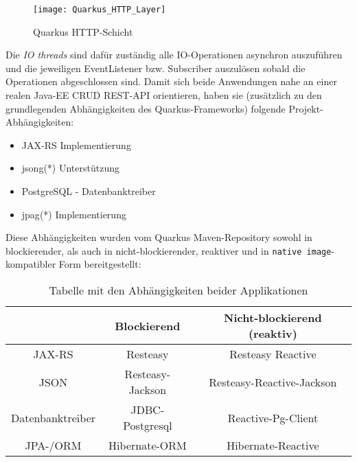 \newpage
\begin{figure}[h]
  \centering
  \texttt{[image: Quarkus\_HTTP\_Layer]}
  \caption{Quarkus HTTP-Schicht \parencite{QuarkusReactiveRoutes}}
  \label{fig:quarkus_http_schicht}
\end{figure}

Die \textit{IO threads} sind dafür zuständig alle IO-Operationen asynchron auszuführen und die jeweiligen EventListener bzw. Subscriber
auszulösen sobald die Operationen abgeschlossen sind.
Damit sich beide Anwendungen nahe an einer realen Java-EE CRUD REST-API orientieren, haben
sie (zusätzlich zu den grundlegenden Abhängigkeiten des Quarkus-Frameworks) folgende Projekt-Abhängigkeiten:
\begin{itemize}
  \item JAX-RS Implementierung
  \item \Gls{jsong}(*) Unterstützung
  \item PostgreSQL - Datenbanktreiber
  \item \Gls{jpag}(*) Implementierung
\end{itemize}

Diese Abhängigkeiten wurden vom Quarkus Maven-Repository sowohl in blockierender,
als auch in nicht-blockierender, reaktiver und in \verb|native image|-kompatibler Form bereitgestellt: \parencite{MavenQuarkusIO}
\setlength{\tabcolsep}{18pt}
\renewcommand{\arraystretch}{1.5}
\begin{table}[ht!]
  \centering
  \begin{tabular}{| c | c | c |}
    \hline
                     & Blockierend      & Nicht-blockierend (reaktiv) \\
    \hline
    JAX-RS           & Resteasy         & Resteasy Reactive           \\
    \hline
    JSON             & Resteasy-Jackson & Resteasy-Reactive-Jackson   \\
    \hline
    Datenbanktreiber & JDBC-Postgresql  & Reactive-Pg-Client          \\
    \hline
    JPA-/ORM         & Hibernate-ORM    & Hibernate-Reactive          \\
    \hline
  \end{tabular}
  \caption{Tabelle mit den Abhängigkeiten beider Applikationen}
  \label{table:dependencies}
\end{table}

